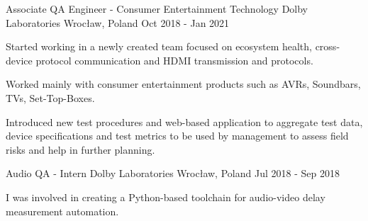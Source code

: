 \begin{cventries}
  \cventry
  {Associate QA Engineer - Consumer Entertainment Technology} %
  {Dolby Laboratories} %
  {Wrocław, Poland} %
  {Oct 2018 - Jan 2021} %
  {
    \begin{cvitems} %
      \item {Started working in a newly created team focused on ecosystem health, cross-device protocol communication and HDMI transmission and protocols.}
      \item {Worked mainly with consumer entertainment products such as AVRs, Soundbars, TVs, Set-Top-Boxes.}
      \item {Introduced new test procedures and web-based application to aggregate test data, device specifications and test metrics to be used by management to assess field risks and help in further planning.}
    \end{cvitems}
  }

  \cventry
  {Audio QA - Intern} %
  {Dolby Laboratories} %
  {Wrocław, Poland} %
  {Jul 2018 - Sep 2018} %
  {
    \begin{cvitems} %
      \item {I was involved in creating a Python-based toolchain for audio-video delay measurement automation.}
    \end{cvitems}
  }

\end{cventries}
